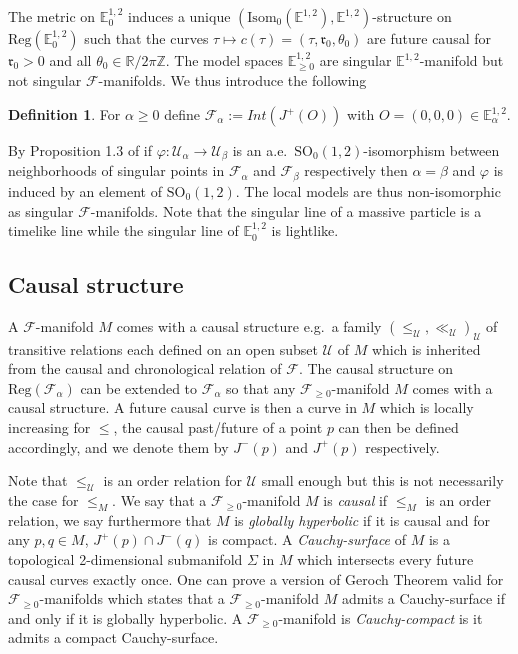 \documentclass[a4paper,12pt]{article}
\def\ZZ{\mathbb{Z}}
\def\r{\mathfrak{r}}
\def\U{\mathcal U}
\def\GGL{\SO_0(1,2)}
\def\isom{Isom}
\def\SO{\mathrm{SO}}
\def\RR{\mathbb{R}}
\newcommand{\mass}[1]{{\mathbb E}^{1,2}_{#1}}
\def\isom{\mathrm{Isom}}
\def\Reg{\mathrm{Reg}}
\def\reg{\Reg}
\def\SO{\mathrm{SO}}
\def\Future{\mathcal F}
\def\isom{\mathrm{Isom}}
\def\reg{\mathrm{Reg}}
\def\U{\mathcal{U}}
\def\Reg{\mathrm{Reg}}
\def\r{\mathfrak{r}}
\def\GG{\isom_0(\mass{})}
\theoremstyle{definition}
\newtheorem{defi}[lem]{Definition}	%
\begin{document}
		The metric on $\mass{0}$ induces a unique $(\GG,\mass{})$-structure on $\reg(\mass{0})$ such that the curves $\tau\mapsto c(\tau)=(\tau,\r_0,\theta_0)$ are future causal for $\r_0>0$ and all $\theta_0\in \RR/2\pi\ZZ$.
		The model spaces $\mass{\geq0}$ are singular $\mass{}$-manifold but not singular $\Future$-manifolds. We thus introduce the following
		
		\begin{defi}\label{def:define} For $\alpha\geq 0$ define $\Future_\alpha:= Int(J^+(O))$ with $O=(0,0,0)\in \mass{\alpha}$.
		\end{defi}
		
		By Proposition 1.3 of \cite{brunswic2021Cauchy} if $\varphi:\U_\alpha\rightarrow \U_\beta$ is an a.e.\ $\GGL$-isomorphism between neighborhoods of singular points in $\Future_\alpha$ and $\Future_\beta$ respectively then $\alpha=\beta$ and $\varphi$ is induced by an element of $\GGL$. The local models are thus non-isomorphic as singular $\Future$-manifolds.
		Note that the singular line of a massive particle is a timelike line while the singular line of $\mass{0}$ is lightlike. 
		
		
	
    
		
		
		
		
		\subsection{Causal structure}
			A $\Future$-manifold $M$ comes with a causal structure e.g.\ a family $(\leq_\U,\ll_\U)_{\U}$ of transitive relations each defined on an open subset $\U$ of $M$ which is inherited from the causal and chronological relation of $\Future$. The causal structure on $\reg(\Future_\alpha)$ can be extended to $\Future_\alpha$ so that any $\Future_{\geq0}$-manifold $M$ comes with a causal structure.
			A future causal curve is then a curve in $M$ which is locally increasing for $\leq$, the causal past/future of a point $p$ can then be defined accordingly, and we denote them by $J^-(p)$ and $J^+(p)$ respectively.
			
			Note that $\leq_\U$ is an order relation for $\U$ small enough but this is not necessarily the case for $\leq_M$. We say that a $\Future_{\geq0}$-manifold $M$ is {\it causal} if $\leq_M$ is an order relation, we say furthermore that $M$ is {\it globally hyperbolic} if it is causal and for any $p,q\in M$, $J^+(p)\cap J^-(q)$ is compact. A {\it Cauchy-surface} of $M$ is a topological 2-dimensional submanifold $\Sigma$ in $M$ which intersects every future causal curves exactly once. One can prove a version of Geroch Theorem valid for $\Future_{\geq0}$-manifolds \cite{MR3783554} which states that a $\Future_{\geq0}$-manifold $M$ admits a Cauchy-surface if and only if it is globally hyperbolic. A $\Future_{\geq0}$-manifold is {\it Cauchy-compact} is it admits a compact Cauchy-surface.
			
\end{document}
